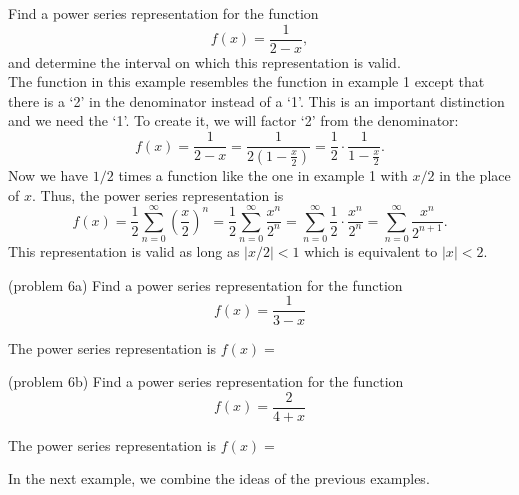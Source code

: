 \documentclass{ximera}
\begin{document}
\begin{example}[example 6]
Find a power series representation for the function
\[
f(x) = \frac{1}{2-x},
\]
and determine the interval on which this representation is valid.\\
The function in this example resembles the function in example 1 except that there is a `2' in the denominator instead of a `1'.
This is an important distinction and we need the `1'. To create it, we will factor `2' from the denominator:
\[
f(x) = \frac{1}{2 -x} = \frac{1}{2(1 - \frac{x}{2})} = \frac12 \cdot \frac{1}{1 - \frac{x}{2}}.
\]
Now we have $1/2$ times a function like the one in example 1 with $x/2$ in the place of $x$.
Thus, the power series representation is
\[
f(x) = \frac12 \sum_{n=0}^\infty \left(\frac{x}{2}\right)^n  = \frac12 \sum_{n=0}^\infty \frac{x^n}{2^n}
=  \sum_{n=0}^\infty \frac12 \cdot \frac{x^n}{2^n} =  \sum_{n=0}^\infty \frac{x^n}{2^{n+1}}.
\]
This representation is valid as long as $|x/2| < 1$ which is equivalent to $|x| < 2$.

\end{example}


\begin{problem}(problem 6a)
Find a power series representation for the function
\[
f(x) = \frac{1}{3-x}
\]

The power series representation is $f(x) = $
\begin{multipleChoice}
\end{multipleChoice}
\end{problem}



\begin{problem}(problem 6b)
Find a power series representation for the function
\[
f(x) = \frac{2}{4+x}
\]

The power series representation is $f(x) = $
\begin{multipleChoice}
\end{multipleChoice}
\end{problem}

In the next example, we combine the ideas of the previous examples.
\end{document}
